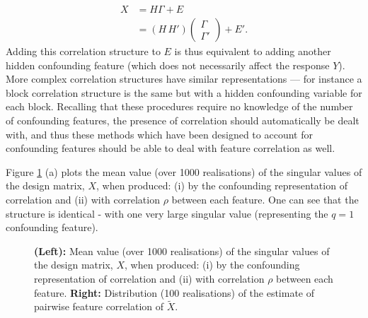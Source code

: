 \documentclass[11pt]{article}
\numberwithin{equation}{section}
\begin{document}
\begin{align*}
	X &= H\Gamma + E \\
	  &= (H\, H')\left( \begin{matrix}
	  	\Gamma \\ \Gamma'
	  \end{matrix} \right) + E'.
\end{align*}
Adding this correlation structure to $E$ is thus equivalent to adding another hidden confounding feature (which does not necessarily affect the response $Y$). More complex correlation structures have similar representations --- for instance a block correlation structure is the same but with a hidden confounding variable for each block.
 Recalling that these procedures require no knowledge of the number of confounding features, the presence of correlation should automatically be dealt with, and thus these methods which have been designed to account for confounding features should be able to deal with feature correlation as well. 

Figure \ref{fig:corr_vs_confounding} (a) plots the mean value (over 1000 realisations) of the singular values of the design matrix, $X$, when produced: (i) by the confounding representation of correlation and (ii) with correlation $\rho$ between each feature. One can see that the structure is identical - with one very large singular value (representing the $q = 1$ confounding feature). 

%

\begin{figure}[h]
\centering
{}
  \caption{{\bf (Left): }Mean value (over 1000 realisations) of the singular values of the design matrix, $X$, when produced: (i) by the confounding representation of correlation and (ii) with correlation $\rho$ between each feature. {\bf Right:} Distribution (100 realisations) of the estimate of pairwise feature correlation of $\tilde{X}$.}
  \label{fig:corr_vs_confounding}
\end{figure}
\end{document}
